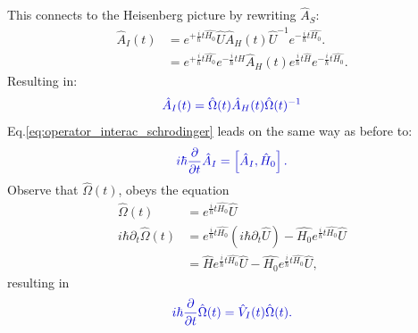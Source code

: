 \documentclass[12pt, titlepage]{article}
\begin{document}
This connects to the Heisenberg picture by rewriting $ \hat{A}_{S} $:
\begin{subequations}
\begin{align}
	\hat{A}_{I}(t)
	&=
	e^{+\frac{i}{\hbar}t \hat{H_{0}}}
	\hat{U}	
	\hat{A}_{H}(t)
	\hat{U}^{-1}	
	e^{-\frac{i}{\hbar}t \hat{H_{0}}}	.
	\\
	&=
	e^{+\frac{i}{\hbar}t \hat{H_{0}}}
	e^{-\frac{i}{\hbar}t\hat{H}}
	\hat{A}_{H}(t)
	e^{\frac{i}{\hbar}t\hat{H}}	
	e^{-\frac{i}{\hbar}t \hat{H_{0}}}	.
\end{align}
\end{subequations}
Resulting in:
\begin{equation}\label{eq:operator_interac_heisenberg}
\textcolor[RGB]{0,0,204}{
	\hat{A}_{I}(t)
	=
	\hat{\Omega}(t)
	\hat{A}_{H}(t)
	\hat{\Omega}(t)^{-1}
}
\end{equation}
Eq.\eqref{eq:operator_interac_schrodinger} leads on the same way as before to:
\begin{equation}\label{eq:time_evo_equ_Intera}
\textcolor[RGB]{0,0,204}{
	i\hbar
	\frac{\partial}{\partial t}
	\hat{A}_{I}
	=
	\left[ 
	\hat{A}_{I},
	\hat{H}_{0}
	\right] .
}
\end{equation}
Observe that $ \hat{\Omega}(t) $, obeys the equation 
\begin{subequations}
\begin{align}
 \hat{\Omega}(t) 
  		&= e^{\frac{i}{\hbar}t \hat{H_{0}}}
			\hat{U}
  		\\
  		i\hbar\partial_{t}\hat{\Omega}(t) 
  		 &= 
  		 e^{\frac{i}{\hbar}t\hat{H_{0}}}
  		 \left(i\hbar\partial_{t}\hat{U} \right)
  		 -
  		 \hat{H_{0}}
   		 e^{\frac{i}{\hbar}t\hat{H_{0}}}
 		 \hat{U}
  		 \\
  		 &=
  		 \hat{H}
  		  e^{\frac{i}{\hbar}t\hat{H_{0}}}  		 
  		 \hat{U}  		 
  		 -
  		 \hat{H_{0}}
  		   e^{\frac{i}{\hbar}t\hat{H_{0}}}
  		 \hat{U},
\end{align}
\end{subequations}
resulting in 
\begin{equation}\label{eq:time_evo_Omega_interaction}
\textcolor[RGB]{0,0,204}{
	i\hbar
	\frac{\partial}{\partial t}
	\hat{\Omega}(t)
	=
	\hat{V}_{I}(t)
	\hat{\Omega}(t)
.}
\end{equation}
\end{document}

